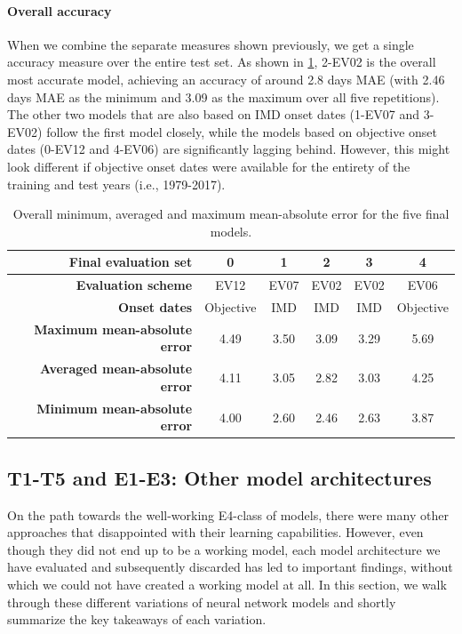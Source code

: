 \paragraph{Overall accuracy}
When we combine the separate measures shown previously, we get a single accuracy measure over the entire test set. As shown in \cref{tab:overall_average}, 2-EV02 is the overall most accurate model, achieving an accuracy of around 2.8 days MAE (with 2.46 days MAE as the minimum and 3.09 as the maximum over all five repetitions). The other two models that are also based on IMD onset dates (1-EV07 and 3-EV02) follow the first model closely, while the models based on objective onset dates (0-EV12 and 4-EV06) are significantly lagging behind. However, this might look different if objective onset dates were available for the entirety of the training and test years (i.e., 1979-2017).

\begin{table}[h!]
  \centering
  \begin{tabular}{rccccc}
    \toprule
    \textbf{Final evaluation set} & \textbf{0} & \textbf{1} & \textbf{2} & \textbf{3} & \textbf{4} \\
    \midrule
    \textbf{Evaluation scheme} & EV12 & EV07 & EV02 & EV02 & EV06 \\
    \textbf{Onset dates} & Objective & IMD & IMD & IMD & Objective \\
    \midrule
    \textbf{Maximum mean-absolute error} & 4.49 & 3.50 & 3.09 & 3.29 & 5.69 \\
    \textbf{Averaged mean-absolute error} & 4.11 & 3.05 & 2.82 & 3.03 & 4.25 \\
    \textbf{Minimum mean-absolute error} & 4.00 & 2.60 & 2.46 & 2.63 & 3.87 \\
    \bottomrule
  \end{tabular}
  \caption{Overall minimum, averaged and maximum mean-absolute error for the five final models.}
  \label{tab:overall_average}
\end{table}

\subsection{T1-T5 and E1-E3: Other model architectures}
\label{sst:other_models}
On the path towards the well-working E4-class of models, there were many other approaches that disappointed with their learning capabilities. However, even though they did not end up to be a working model, each model architecture we have evaluated and subsequently discarded has led to important findings, without which we could not have created a working model at all. In this section, we walk through these different variations of neural network models and shortly summarize the key takeaways of each variation.

